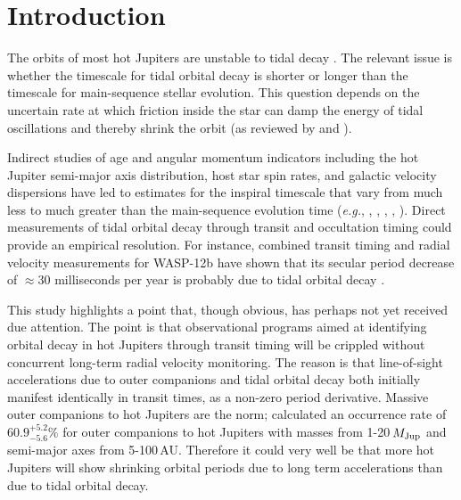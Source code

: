 \documentclass[12pt,twocolumn,tighten]{aastex62}
\begin{document}


\section{Introduction}

The orbits of most hot Jupiters are unstable to tidal decay
\citep{counselman_outcomes_1973,hut_stability_1980,rasio_tidal_1996,levrard_falling_2009,matsumura_tidal_2010}.
The relevant issue is whether the timescale for tidal orbital decay is
shorter or longer than the timescale for main-sequence stellar
evolution.  This question depends on the uncertain rate at which
friction inside the star can damp the energy of tidal oscillations and
thereby shrink the orbit (as reviewed by \citealt{Mazeh2008} and
\citealt{ogilvie_tidal_2014}).

Indirect studies of age and angular momentum indicators including the
hot Jupiter semi-major axis distribution, host star spin rates, and
galactic velocity dispersions have led to estimates for the inspiral
timescale that vary from much less to much greater than the
main-sequence evolution time  ({\it e.g.},
\citealt{jackson_observational_2009}, \citealt{teitler_why_2014},
\citealt{penev_empirical_2018}, \citealt{cameron_hierarchical_2018},
\citealt{hamer_schlaufman_2019}).  Direct measurements of tidal
orbital decay through transit and occultation timing could provide an
empirical resolution.  For instance, combined transit timing and
radial velocity measurements for WASP-12b have shown that its secular
period decrease of $\approx$30 milliseconds per year is probably due
to tidal orbital decay
\citep{maciejewski_departure_2016,patra_2017,yee_orbit_2020}.

This study highlights a point that, though obvious, has perhaps not
yet received due attention.  The point is that observational programs
aimed at identifying orbital decay in hot Jupiters through transit
timing will be crippled without concurrent long-term radial velocity
monitoring.  The reason is that line-of-sight accelerations due to
outer companions \citep[{\it e.g.},][]{agol_detecting_2005} and tidal
orbital decay both initially manifest identically in transit times, as
a non-zero period derivative.  Massive outer companions to hot
Jupiters are the norm; \citet{bryan_statistics_2016} calculated an
occurrence rate of $60.9^{+5.2}_{-5.6}\%$ for outer companions to hot
Jupiters with masses from 1-20$\,$$M_{\rm Jup}$ and semi-major axes
from 5-100$\,$AU.  Therefore it could very well be that more hot
Jupiters will show shrinking orbital periods due to long term
accelerations than due to tidal orbital decay.
\end{document}
